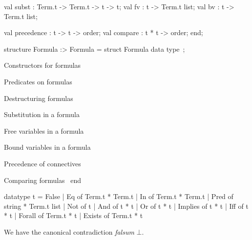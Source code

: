   val subst : Term.t -> Term.t -> t -> t;
  val fv : t -> Term.t list;
  val bv : t -> Term.t list;

  val precedence : t -> t -> order;
  val compare : t * t -> order;
end;
\nwendcode{}\nwdocspar

\nwenddocs{}\endmoddef\nwstartdeflinemarkup\nwenddeflinemarkup
structure Formula :> Formula = struct
\LA{}Formula data type~{\nwtagstyle{}}\RA{};

\LA{}Constructors for formulas~{\nwtagstyle{}}\RA{}

\LA{}Predicates on formulas~{\nwtagstyle{}}\RA{}

\LA{}Destructuring formulas~{\nwtagstyle{}}\RA{}

\LA{}Substitution in a formula~{\nwtagstyle{}}\RA{}

\LA{}Free variables in a formula~{\nwtagstyle{}}\RA{}

\LA{}Bound variables in a formula~{\nwtagstyle{}}\RA{}

\LA{}Precedence of connectives~{\nwtagstyle{}}\RA{}

\LA{}Comparing formulas~{\nwtagstyle{}}\RA{}
end
\nwendcode{}\nwdocspar

\nwenddocs{}\endmoddef\nwstartdeflinemarkup{}\nwenddeflinemarkup
datatype t = False
           | Eq of Term.t * Term.t
           | In of Term.t * Term.t
           | Pred of string * Term.t list
           | Not of t
           | And of t * t
           | Or of t * t
           | Implies of t * t
           | Iff of t * t
           | Forall of Term.t * t
           | Exists of Term.t * t
\eatline
{}\nwendcode{}\nwdocspar
\begin{node}
We have the canonical contradiction \textit{falsum} $\bot$.
\end{node}

